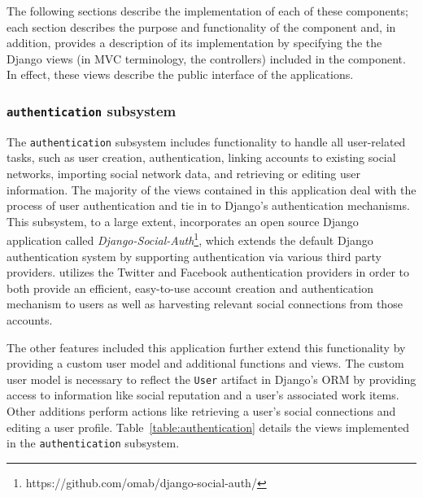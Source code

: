 The following sections describe the implementation of each of these components; each section describes the purpose and functionality of the component and, in addition, provides a description of its implementation by specifying the the Django views (in MVC terminology, the controllers) included in the component.  In effect, these views describe the public interface of the applications.

\subsubsection {{\tt authentication} subsystem}

The {\tt authentication} subsystem includes functionality to handle all user-related tasks, such as user creation, authentication, linking accounts to existing social networks, importing social network data, and retrieving or editing user information.  The majority of the views contained in this application deal with the process of user authentication and tie in to Django's authentication mechanisms.  This subsystem, to a large extent, incorporates an open source Django application called {\em Django-Social-Auth}\footnote{https://github.com/omab/django-social-auth/}, which extends the default Django authentication system by supporting authentication via various third party providers.  \nplh{} utilizes the Twitter and Facebook authentication providers in order to both provide an efficient, easy-to-use account creation and authentication mechanism to users as well as harvesting relevant social connections from those accounts.  

The other features included this application further extend this functionality by providing a custom user model and additional functions and views.  The custom user model is necessary to reflect the {\tt User} artifact in Django's ORM by providing access to information like social reputation and a user's associated work items.  Other additions perform actions like retrieving a user's social connections and editing a user profile.  Table~\ref{table:authentication} details the views implemented in the {\tt authentication} subsystem.

